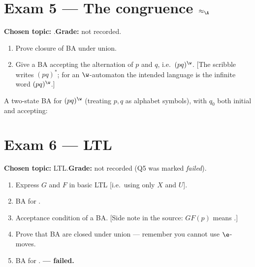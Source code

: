 \documentclass[oneside]{academica}
\begin{document}
\section{Exam 5 --- The congruence \texorpdfstring{$\approx_{\A}$}{~A}}
\textbf{Chosen topic:} .\quad\textbf{Grade:} not recorded.

\begin{enumerate}
  \item Prove closure of BA under union.
  \item Give a BA accepting the alternation of $p$ and $q$, i.e.\
    $(pq)^{\w}$. [The scribble writes $(pq)^*$; for an
    $\w$-automaton the intended language is the infinite word $(pq)^{\w}$.]
\end{enumerate}

\noindent A two-state BA for $(pq)^{\w}$ (treating $p,q$ as alphabet
symbols), with $q_0$ both initial and accepting:
\begin{center}

\end{center}

\section{Exam 6 --- LTL}
\textbf{Chosen topic:} LTL.\quad\textbf{Grade:} not recorded (Q5 was
marked \emph{failed}).

\begin{enumerate}
  \item Express $G$ and $F$ in basic LTL [i.e.\ using only $X$ and $U$].
  \item BA for \quoted{infinitely many $a$}.
  \item Acceptance condition of a BA. [Side note in the source:
    $GF(p)$ means .]
  \item Prove that BA are closed under union --- remember you cannot use
    $\e$-moves.
  \item BA for . \textbf{--- failed.}
\end{enumerate}

\end{document}
